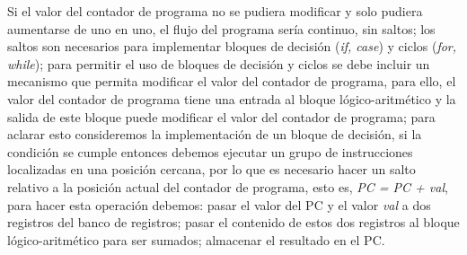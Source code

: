 Si el valor del contador de programa no se pudiera modificar y solo pudiera aumentarse de uno en uno, el flujo del programa sería continuo, sin saltos; los saltos son necesarios para implementar bloques de decisión (\textit{if, case}) y ciclos (\textit{for, while}); para permitir el uso de bloques de decisión y ciclos se debe incluir un mecanismo que permita modificar el valor del contador de programa, para ello, el valor del contador de programa tiene una entrada al bloque lógico-aritmético y la salida de este bloque puede modificar el valor del contador de programa; para aclarar esto consideremos la implementación de un bloque de decisión, si la condición se cumple entonces debemos ejecutar un grupo de instrucciones localizadas en una posición cercana, por lo que es necesario hacer un salto relativo a la posición actual del contador de programa, esto es, \textit{PC = PC + val}, para hacer esta operación debemos: pasar el valor del PC y el valor \textit{val} a dos registros del banco de registros; pasar el 
contenido de estos dos registros al bloque lógico-aritmético para ser sumados; almacenar el resultado en el PC.


